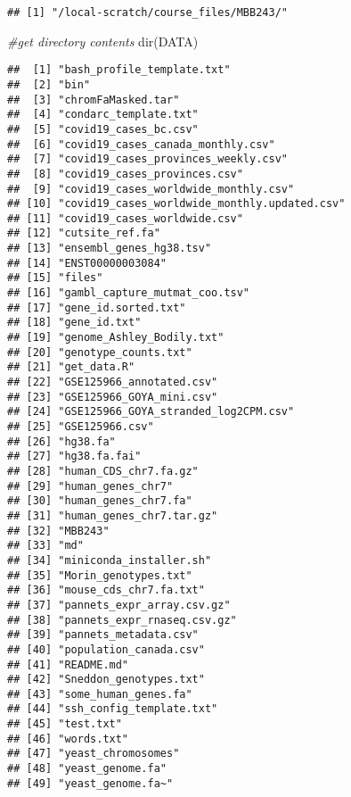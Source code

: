 \documentclass[
]{article}
\newenvironment{Shaded}{\begin{snugshade}}{\end{snugshade}}
\newcommand{\CommentTok}[1]{\textcolor[rgb]{0.56,0.35,0.01}{\textit{#1}}}
\newcommand{\FunctionTok}[1]{\textcolor[rgb]{0.00,0.00,0.00}{#1}}
\newcommand{\NormalTok}[1]{#1}
\begin{document}
\begin{verbatim}
## [1] "/local-scratch/course_files/MBB243/"
\end{verbatim}

\begin{Shaded}
\begin{Highlighting}[]
\CommentTok{\#get directory contents}
\FunctionTok{dir}\NormalTok{(DATA)}
\end{Highlighting}
\end{Shaded}

\begin{verbatim}
##  [1] "bash_profile_template.txt"                  
##  [2] "bin"                                        
##  [3] "chromFaMasked.tar"                          
##  [4] "condarc_template.txt"                       
##  [5] "covid19_cases_bc.csv"                       
##  [6] "covid19_cases_canada_monthly.csv"           
##  [7] "covid19_cases_provinces_weekly.csv"         
##  [8] "covid19_cases_provinces.csv"                
##  [9] "covid19_cases_worldwide_monthly.csv"        
## [10] "covid19_cases_worldwide_monthly.updated.csv"
## [11] "covid19_cases_worldwide.csv"                
## [12] "cutsite_ref.fa"                             
## [13] "ensembl_genes_hg38.tsv"                     
## [14] "ENST00000003084"                            
## [15] "files"                                      
## [16] "gambl_capture_mutmat_coo.tsv"               
## [17] "gene_id.sorted.txt"                         
## [18] "gene_id.txt"                                
## [19] "genome_Ashley_Bodily.txt"                   
## [20] "genotype_counts.txt"                        
## [21] "get_data.R"                                 
## [22] "GSE125966_annotated.csv"                    
## [23] "GSE125966_GOYA_mini.csv"                    
## [24] "GSE125966_GOYA_stranded_log2CPM.csv"        
## [25] "GSE125966.csv"                              
## [26] "hg38.fa"                                    
## [27] "hg38.fa.fai"                                
## [28] "human_CDS_chr7.fa.gz"                       
## [29] "human_genes_chr7"                           
## [30] "human_genes_chr7.fa"                        
## [31] "human_genes_chr7.tar.gz"                    
## [32] "MBB243"                                     
## [33] "md"                                         
## [34] "miniconda_installer.sh"                     
## [35] "Morin_genotypes.txt"                        
## [36] "mouse_cds_chr7.fa.txt"                      
## [37] "pannets_expr_array.csv.gz"                  
## [38] "pannets_expr_rnaseq.csv.gz"                 
## [39] "pannets_metadata.csv"                       
## [40] "population_canada.csv"                      
## [41] "README.md"                                  
## [42] "Sneddon_genotypes.txt"                      
## [43] "some_human_genes.fa"                        
## [44] "ssh_config_template.txt"                    
## [45] "test.txt"                                   
## [46] "words.txt"                                  
## [47] "yeast_chromosomes"                          
## [48] "yeast_genome.fa"                            
## [49] "yeast_genome.fa~"
\end{verbatim}
\end{document}
